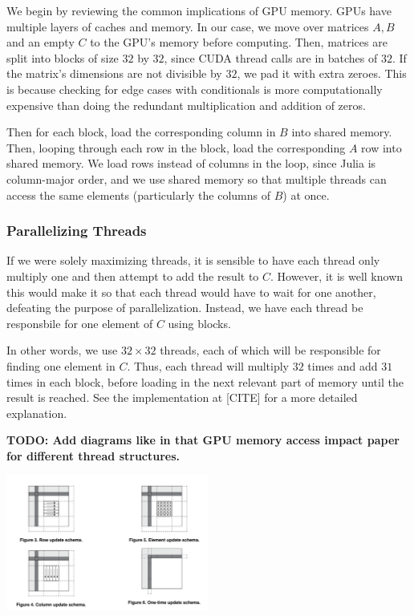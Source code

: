 We begin by reviewing the common implications of GPU memory. GPUs have multiple layers of caches and memory. In our case, we move over matrices $A, B$ and an empty $C$ to the GPU's memory before computing. Then, matrices are split into blocks of size $32$ by $32$, since CUDA thread calls are in batches of $32$. If the matrix's dimensions are not divisible by $32$, we pad it with extra zeroes. This is because checking for edge cases with conditionals is more computationally expensive than doing the redundant multiplication and addition of zeros.

Then for each block, load the corresponding column in $B$ into shared memory. Then, looping through each row in the block, load the corresponding $A$ row into shared memory. We load rows instead of columns in the loop, since Julia is column-major order, and we use shared memory so that multiple threads can access the same elements (particularly the columns of $B$) at once.

\subsubsection{Parallelizing Threads}

If we were solely maximizing threads, it is sensible to have each thread only multiply one and then attempt to add the result to $C$. However, it is well known this would make it so that each thread would have to wait for one another, defeating the purpose of parallelization. Instead, we have each thread be responsbile for one element of $C$ using blocks. 

In other words, we use $32 \times 32$ threads, each of which will be responsible for finding one element in $C$. Thus, each thread will multiply $32$ times and add $31$ times in each block, before loading in the next relevant part of memory until the result is reached. See the implementation at [CITE] for a more detailed explanation.

\textbf{TODO: Add diagrams like in that GPU memory access impact paper for different thread structures.}

\begin{center}
\includegraphics*[width=0.5\textwidth]{MatMulThreads.png}
\end{center}

